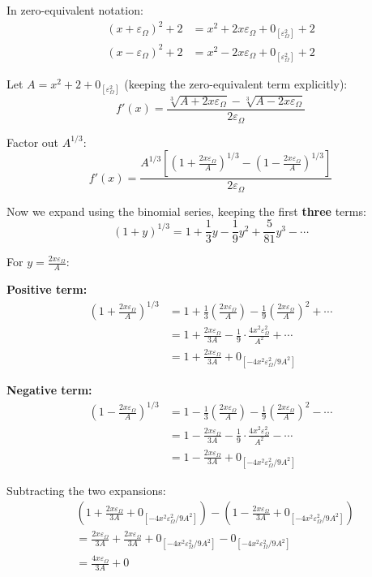 \documentclass{article}
\begin{document}
In zero-equivalent notation:
\begin{align*}
(x + \varepsilon_\Omega)^2 + 2 &= x^2 + 2x\varepsilon_\Omega + 0_{[\varepsilon_\Omega^2]} + 2 \\
(x - \varepsilon_\Omega)^2 + 2 &= x^2 - 2x\varepsilon_\Omega + 0_{[\varepsilon_\Omega^2]} + 2 
\end{align*}

Let $A = x^2 + 2 + 0_{[\varepsilon_\Omega^2]}$ (keeping the zero-equivalent term explicitly):
$$f'(x) = \frac{\sqrt[3]{A + 2x\varepsilon_\Omega} - \sqrt[3]{A - 2x\varepsilon_\Omega}}{2\varepsilon_\Omega}$$

Factor out $A^{1/3}$:
$$f'(x) = \frac{A^{1/3}\left[\left(1 + \frac{2x\varepsilon_\Omega}{A}\right)^{1/3} - \left(1 - \frac{2x\varepsilon_\Omega}{A}\right)^{1/3}\right]}{2\varepsilon_\Omega}$$

Now we expand using the binomial series, keeping the first \textbf{three} terms:
$$(1 + y)^{1/3} = 1 + \frac{1}{3}y - \frac{1}{9}y^2 + \frac{5}{81}y^3 - \cdots$$

For $y = \frac{2x\varepsilon_\Omega}{A}$:

\textbf{Positive term:}
\begin{align*}
\left(1 + \frac{2x\varepsilon_\Omega}{A}\right)^{1/3} &= 1 + \frac{1}{3}\left(\frac{2x\varepsilon_\Omega}{A}\right) - \frac{1}{9}\left(\frac{2x\varepsilon_\Omega}{A}\right)^2 + \cdots \\
&= 1 + \frac{2x\varepsilon_\Omega}{3A} - \frac{1}{9} \cdot \frac{4x^2\varepsilon_\Omega^2}{A^2} + \cdots \\
&= 1 + \frac{2x\varepsilon_\Omega}{3A} + 0_{[-4x^2\varepsilon_\Omega^2/9A^2]}
\end{align*}

\textbf{Negative term:}
\begin{align*}
\left(1 - \frac{2x\varepsilon_\Omega}{A}\right)^{1/3} &= 1 - \frac{1}{3}\left(\frac{2x\varepsilon_\Omega}{A}\right) - \frac{1}{9}\left(\frac{2x\varepsilon_\Omega}{A}\right)^2 - \cdots \\
&= 1 - \frac{2x\varepsilon_\Omega}{3A} - \frac{1}{9} \cdot \frac{4x^2\varepsilon_\Omega^2}{A^2} - \cdots \\
&= 1 - \frac{2x\varepsilon_\Omega}{3A} + 0_{[-4x^2\varepsilon_\Omega^2/9A^2]}
\end{align*}

Subtracting the two expansions:
\begin{align*}
&\left(1 + \frac{2x\varepsilon_\Omega}{3A} + 0_{[-4x^2\varepsilon_\Omega^2/9A^2]}\right) - \left(1 - \frac{2x\varepsilon_\Omega}{3A} + 0_{[-4x^2\varepsilon_\Omega^2/9A^2]}\right) \\
&= \frac{2x\varepsilon_\Omega}{3A} + \frac{2x\varepsilon_\Omega}{3A} + 0_{[-4x^2\varepsilon_\Omega^2/9A^2]} - 0_{[-4x^2\varepsilon_\Omega^2/9A^2]} \\
&= \frac{4x\varepsilon_\Omega}{3A} + 0
\end{align*}
\end{document}
